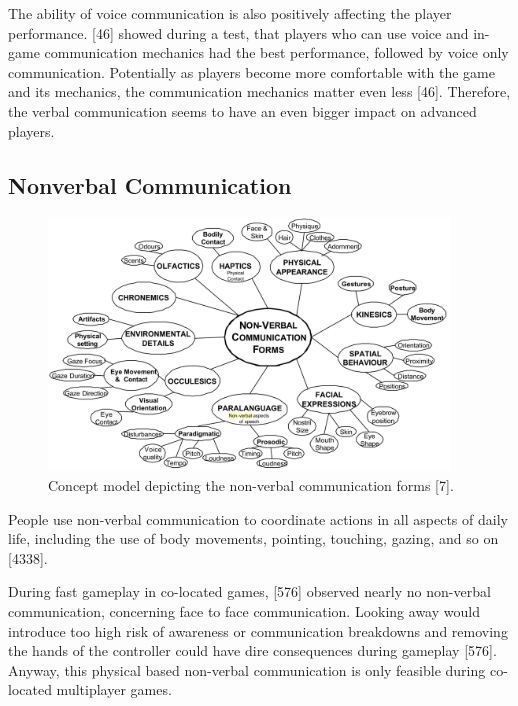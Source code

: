 The ability of voice communication is also positively affecting the player performance. \textcite{Vaddi2016Investigating2}[46] showed during a test, that players who can use voice and in-game communication mechanics had the best performance, followed by voice only communication. Potentially as players become more comfortable with the game and its mechanics, the communication mechanics matter even less \autocite{Vaddi2016Investigating2}[46]. Therefore, the verbal communication seems to have an even bigger impact on advanced players.




\subsection{Nonverbal Communication}
\label{section:Nonverbal Communication}

\begin{figure}
    \centering
    \includegraphics[width=0.95\textwidth]{images/non-verbal_communication_forms.png}
    \caption{ Concept model depicting the non-verbal communication forms
    \break
    \autocite{Manninen2002Non-VerbalSession}[7]. }
    \label{fig:non-verbal communication forms}
\end{figure}

People use non-verbal communication to coordinate actions in all aspects of daily life, including the use of body movements, pointing, touching, gazing, and so on \autocite{Leavitt2016PingGames}[4338].

During fast gameplay in co-located games, \textcite{Cheung2012CommunicationGaming}[576] observed nearly no non-verbal communication, concerning face to face communication.
Looking away would introduce too high risk of awareness or communication breakdowns and removing the hands of the controller could have dire consequences during gameplay \autocite{Cheung2012CommunicationGaming}[576]. Anyway, this physical based non-verbal communication is only feasible during co-located multiplayer games.


